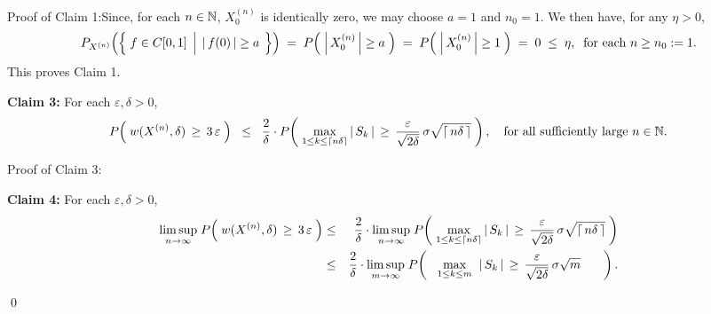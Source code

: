 \vskip 0.5cm
\noindent
Proof of Claim 1:\quad Since, for each $n \in \mathbb{N}$, $X^{(n)}_{0}$ is identically zero, we may
choose $a = 1$ and $n_{0} = 1$. We then have, for any $\eta > 0$,
\begin{equation*}
	P_{X^{(n)}}\!\left(\left\{\;
		f \in \Czo
		\;\left\vert\;\,
		\vert\,f(0)\,\vert \overset{{\color{white}.}}{\geq} a
		\right.
	\;\right\}\right)
	\;=\;
	P\!\left(\; \left\vert\,X^{(n)}_{0}\,\right\vert \overset{{\color{white}.}}{\geq} a \;\right)
	\;=\;
	P\!\left(\; \left\vert\,X^{(n)}_{0}\,\right\vert \overset{{\color{white}.}}{\geq} 1 \;\right)
	\;=\; 0 \;\leq\; \eta,
	\;\;\textnormal{for each $n \geq n_{0} := 1$}.
\end{equation*}
This proves Claim 1.

\vskip 0.5cm
\begin{center}
\begin{minipage}{6.5in}
\noindent
\textbf{Claim 3:}\quad
For each $\varepsilon, \delta > 0$,
\begin{equation*}
P\!\left(\; w(X^{(n)},\delta) \,\overset{{\color{white}.}}{\geq}\, 3\,\varepsilon \;\right)
\;\; \leq \;\;	\dfrac{2}{\delta}\cdot
	P\!\left(\;
		\underset{1 \leq k\leq\lceil n\delta \rceil}{\max}\,\vert\,S_{k}\,\vert
		\,\overset{{\color{white}.}}{\geq}\,
		\dfrac{\varepsilon}{\sqrt{2\delta}}\,\sigma\sqrt{\lceil\,n\delta\,\rceil} 
	\;\right),
	\quad\textnormal{for all sufficiently large $n \in \N$}.
\end{equation*}
\end{minipage}
\end{center}
Proof of Claim 3:\quad

\vskip 0.5cm
\begin{center}
\begin{minipage}{6.5in}
\noindent
\textbf{Claim 4:}\quad
For each $\varepsilon, \delta > 0$,
\begin{eqnarray*}
	\underset{n\rightarrow\infty}{\limsup}\;
	P\!\left(\; w(X^{(n)},\delta) \,\overset{{\color{white}.}}{\geq}\, 3\,\varepsilon \;\right)
&\leq& \dfrac{2}{\delta}\cdot
	\underset{n\rightarrow\infty}{\limsup}\;
	P\!\left(\;
	\underset{1 \leq k\leq\lceil n\delta \rceil}{\max}\,\vert\,S_{k}\,\vert
	\,\overset{{\color{white}.}}{\geq}\,
	\dfrac{\varepsilon}{\sqrt{2\delta}}\,\sigma\sqrt{\lceil\,n\delta\,\rceil} 
	\;\right)
\\
&\leq& \dfrac{2}{\delta}\cdot
	\underset{m\rightarrow\infty}{\limsup}\;
	P\!\left(\;\;\;
	\underset{1 \leq k\leq m}{\max}\;\;\vert\,S_{k}\,\vert
	\,\overset{{\color{white}.}}{\geq}\,
	\dfrac{\varepsilon}{\sqrt{2\delta}}\,\sigma\sqrt{m} 
	\quad\;\;\;\right).
\end{eqnarray*}
\end{minipage}
\end{center}

\qed

